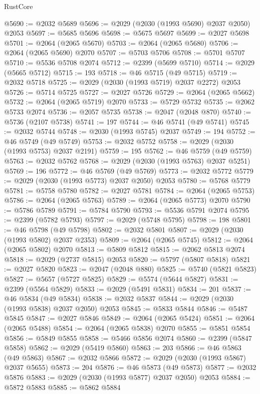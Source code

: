 \begin{lexlean}{RustCore}
\begin{coremodule}
@5690 := @2032 @5689
@5696 := @2029 (@2030 (@1993 @5690) @2037 @2050) @2053
@5697 := @5685 @5696
@5698 := @5675 @5697
@5699 := @2027 @5698
@5701 := @2064 (@2065 @5670)
@5703 := @2064 (@2065 @5680)
@5706 := @2064 (@2065 @5690) @2070
@5707 := @5703 @5706
@5708 := @5701 @5707
@5710 := @5536 @5708 @2074
@5712 := @2399 (@5699 @5710)
@5714 := @2029 (@5665 @5712)
@5715 := 193
@5718 := @46 @5715 (@49 @5715)
@5719 := @2032 @5718
@5725 := @2029 (@2030 (@1993 @5719) @2037 @2272) @2053
@5726 := @5714 @5725
@5727 := @2027 @5726
@5729 := @2064 (@2065 @5662)
@5732 := @2064 (@2065 @5719) @2070
@5733 := @5729 @5732
@5735 := @2062 @5733 @2074
@5736 := @2057 @5735
@5738 := @2047 (@2048 @870)
@5740 := @5736 (@2107 @5738)
@5741 := 197
@5744 := @46 @5741 (@49 @5741)
@5745 := @2032 @5744
@5748 := @2030 (@1993 @5745) @2037
@5749 := 194
@5752 := @46 @5749 (@49 @5749)
@5753 := @2032 @5752
@5758 := @2029 (@2030 (@1993 @5753) @2037 @2191)
@5759 := 195
@5762 := @46 @5759 (@49 @5759)
@5763 := @2032 @5762
@5768 := @2029 (@2030 (@1993 @5763) @2037 @5251)
@5769 := 196
@5772 := @46 @5769 (@49 @5769)
@5773 := @2032 @5772
@5779 := @2029 (@2030 (@1993 @5773) @2037 @2050) @2053
@5780 := @5768 @5779
@5781 := @5758 @5780
@5782 := @2027 @5781
@5784 := @2064 (@2065 @5753)
@5786 := @2064 (@2065 @5763)
@5789 := @2064 (@2065 @5773) @2070
@5790 := @5786 @5789
@5791 := @5784 @5790
@5793 := @5536 @5791 @2074
@5795 := @2399 (@5782 @5793)
@5797 := @2029 (@5748 @5795)
@5798 := 198
@5801 := @46 @5798 (@49 @5798)
@5802 := @2032 @5801
@5807 := @2029 (@2030 (@1993 @5802) @2037 @2353)
@5809 := @2064 (@2065 @5745)
@5812 := @2064 (@2065 @5802) @2070
@5813 := @5809 @5812
@5815 := @2062 @5813 @2074
@5818 := @2029 (@2737 @5815) @2053
@5820 := @5797 (@5807 @5818)
@5821 := @2027 @5820
@5823 := @2047 (@2048 @880)
@5825 := @5740 (@5821 @5823)
@5827 := @5657 (@5727 @5825)
@5829 := @5574 (@5644 @5827)
@5831 := @2399 (@5564 @5829)
@5833 := @2029 (@5491 @5831)
@5834 := 201
@5837 := @46 @5834 (@49 @5834)
@5838 := @2032 @5837
@5844 := @2029 (@2030 (@1993 @5838) @2037 @2050) @2053
@5845 := @5833 @5844
@5846 := @5487 @5845
@5847 := @2027 @5846
@5849 := @2064 (@2065 @5424)
@5851 := @2064 (@2065 @5488)
@5854 := @2064 (@2065 @5838) @2070
@5855 := @5851 @5854
@5856 := @5849 @5855
@5858 := @5466 @5856 @2074
@5860 := @2399 (@5847 @5858)
@5862 := @2029 (@5419 @5860)
@5863 := 203
@5866 := @46 @5863 (@49 @5863)
@5867 := @2032 @5866
@5872 := @2029 (@2030 (@1993 @5867) @2037 @5655)
@5873 := 204
@5876 := @46 @5873 (@49 @5873)
@5877 := @2032 @5876
@5883 := @2029 (@2030 (@1993 @5877) @2037 @2050) @2053
@5884 := @5872 @5883
@5885 := @5862 @5884

\end{coremodule}
\end{lexlean}
